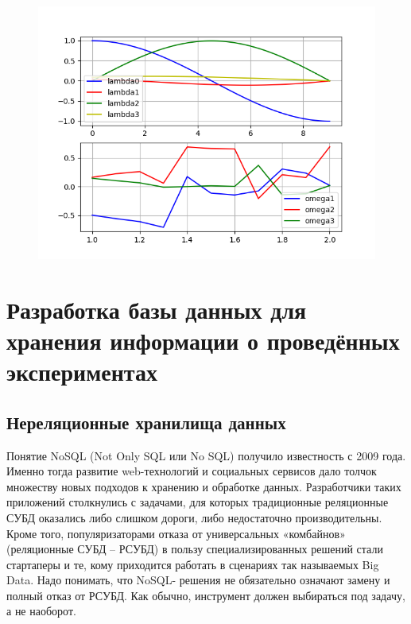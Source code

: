 \documentclass[14pt]{extreport}
\begin{document}
\begin{figure}[H]
\center\includegraphics[scale=0.8]{fig/ivp_and_control_alpha2_1-2_5.png}
\caption{}
\end{figure}

\chapter{Разработка базы данных для хранения информации о проведённых экспериментах}
\section{Нереляционные хранилища данных}
Понятие NoSQL (Not Only SQL или No SQL) получило известность с 2009 года. Именно тогда развитие web-технологий и социальных сервисов дало толчок множеству новых подходов к хранению и обработке данных. Разработчики таких приложений столкнулись с задачами, для которых традиционные реляционные СУБД оказались либо слишком дороги, либо недостаточно производительны. Кроме того, популяризаторами отказа от универсальных «комбайнов» (реляционные СУБД – РСУБД) в пользу специализированных решений стали стартаперы и те, кому приходится работать в сценариях так называемых Big Data. Надо понимать, что NoSQL- решения не обязательно означают замену и полный отказ от РСУБД. Как обычно, инструмент должен выбираться под задачу, а не наоборот.
\end{document}
